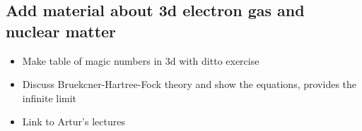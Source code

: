 \documentclass[%
twoside,                 %
final,                   %
10pt]{article}
\begin{document}
\subsection{Add material about 3d electron gas and nuclear matter}
\begin{itemize}
\item Make table of magic numbers in 3d with ditto exercise

\item Discuss Bruekcner-Hartree-Fock theory and show the equations, provides the infinite limit

\item Link to Artur's lectures
\end{itemize}

\noindent



\printindex
\end{document}
